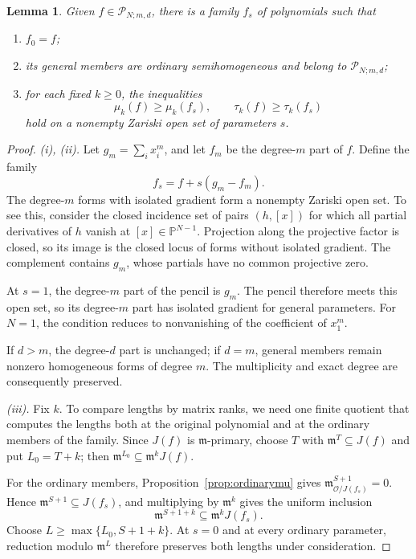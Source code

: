 \documentclass[12pt,reqno]{amsart}
\newcommand{\mm}{\mathfrak m}
\newcommand{\Pclass}{\mathcal P_{N;m,d}}
\newcommand{\OO}{\mathcal O}
\newtheorem{lemma}[theorem]{Lemma}
\theoremstyle{definition}
\begin{document}
\begin{lemma}\label{lem:usc}
Given $f\in\Pclass$, there is a family $f_s$ of polynomials
such that
 \begin{enumerate}
  \item $f_0=f$;
  \item its general members are ordinary semihomogeneous and belong
to $\Pclass$;
\item for each fixed
$k\geq0$, the inequalities
\begin{equation}\label{eq:usc}
 \mu_k(f)\geq\mu_k(f_s),\qquad \tau_k(f)\geq\tau_k(f_s)
\end{equation}
hold on a nonempty Zariski open set of parameters $s$.
\end{enumerate}
\end{lemma}
\begin{proof}
 
\emph{(i), (ii).}
Let $g_m=\sum_i x_i^m$, and let $f_m$ be the degree-$m$ part of $f$.
Define the family
\[
 f_s=f+s(g_m-f_m).
\]
The degree-$m$ forms with isolated gradient form a nonempty Zariski
open set. To see this, consider the closed incidence set of pairs
$(h,[x])$ for which all partial derivatives of $h$ vanish at
$[x]\in\mathbb P^{N-1}$. Projection along the projective factor
is closed, so its image is the closed locus of forms without
isolated gradient. The complement contains $g_m$, whose partials
have no common projective zero.

At $s=1$, the degree-$m$ part of the pencil is $g_m$. The pencil
therefore meets this open set, so its degree-$m$ part has isolated
gradient for general parameters. For $N=1$, the condition reduces to
nonvanishing of the coefficient of $x_1^m$.

If $d>m$, the degree-$d$ part is unchanged; if $d=m$, general
members remain nonzero homogeneous forms of degree $m$.
The multiplicity and exact degree are consequently preserved.

 
\emph{(iii).}
Fix $k$. To compare lengths by matrix ranks, we need one finite
quotient that computes the lengths both at the original polynomial
and at the ordinary members of the family. Since $J(f)$ is
$\mm$-primary, choose $T$ with
$\mm^T\subseteq J(f)$ and put $L_0=T+k$; then
$\mm^{L_0}\subseteq\mm^kJ(f)$.

For the ordinary members, Proposition~\ref{prop:ordinarymu} gives
$\mm_{\OO/J(f_s)}^{S+1}=0$. Hence $\mm^{S+1}\subseteq J(f_s)$,
and multiplying by $\mm^k$ gives the
uniform inclusion
\[
 \mm^{S+1+k}\subseteq\mm^kJ(f_s).
\]
Choose $L\geq\max\{L_0,S+1+k\}$.
At $s=0$ and at every ordinary parameter, reduction modulo $\mm^L$
therefore preserves both lengths under consideration.


\end{proof}
\end{document}
